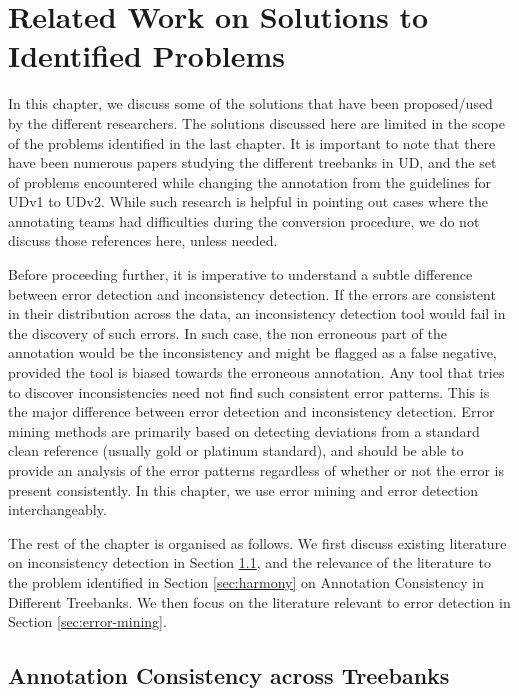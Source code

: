 \chapter{Related Work on Solutions to Identified Problems}
\label{chap:prev_research}

In this chapter, we discuss some of the solutions that have been proposed/used by the different researchers. The solutions discussed here are limited in the scope of the problems identified in the last chapter. It is important to note that there have been numerous papers studying the different treebanks in UD, and the set of problems encountered while changing the annotation from the guidelines for UDv1 to UDv2. While such research is helpful in pointing out cases where the annotating teams had difficulties during the conversion procedure, we do not discuss those references here, unless needed.

Before proceeding further, it is imperative to understand a subtle difference between error detection and inconsistency detection. If the errors are consistent in their distribution across the data, an inconsistency detection tool would fail in the discovery of such errors. In such case, the non erroneous part of the annotation would be the inconsistency and might be flagged as a false negative, provided the tool is biased towards the erroneous annotation. Any tool that tries to discover inconsistencies need not find such consistent error patterns. This is the major difference between error detection and inconsistency detection. Error mining methods are primarily based on detecting deviations from a standard clean reference (usually gold or platinum standard), and should be able to provide an analysis of the error patterns regardless of whether or not the error is present consistently. In this chapter, we use error mining and error detection interchangeably.

The rest of the chapter is organised as follows. We first discuss existing literature on inconsistency detection in Section \ref{sec:inconsistency-detection}, and the relevance of the literature to the problem identified in Section \ref{sec:harmony} on Annotation Consistency in Different Treebanks. We then focus on the literature relevant to error detection in Section \ref{sec:error-mining}.

\section{Annotation Consistency across Treebanks}
\label{sec:inconsistency-detection}

